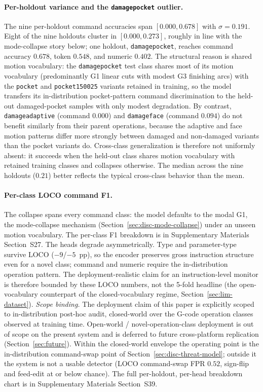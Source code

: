 \documentclass[sensors,article,submit,moreauthors,pdftex]{Definitions/mdpi}
\begin{document}
\paragraph{Per-holdout variance and the \texttt{damagepocket} outlier.} The nine per-holdout command accuracies span $[0.000, 0.678]$ with $\sigma = 0.191$. Eight of the nine holdouts cluster in $[0.000, 0.273]$, roughly in line with the mode-collapse story below; one holdout, \texttt{damagepocket}, reaches command accuracy $0.678$, token $0.548$, and numeric $0.402$. The structural reason is shared motion vocabulary: the \texttt{damagepocket} test class shares most of its motion vocabulary (predominantly G1 linear cuts with modest G3 finishing arcs) with the \texttt{pocket} and \texttt{pocket150025} variants retained in training, so the model transfers its in-distribution pocket-pattern command discrimination to the held-out damaged-pocket samples with only modest degradation. By contrast, \texttt{damageadaptive} (command $0.000$) and \texttt{damageface} (command $0.094$) do not benefit similarly from their parent operations, because the adaptive and face motion patterns differ more strongly between damaged and non-damaged variants than the pocket variants do. Cross-class generalization is therefore not uniformly absent: it succeeds when the held-out class shares motion vocabulary with retained training classes and collapses otherwise. The median across the nine holdouts ($0.21$) better reflects the typical cross-class behavior than the mean.

\paragraph{Per-class LOCO command F1.} The collapse spans every command class: the model defaults to the modal G1, the mode-collapse mechanism (Section~\ref{sec:disc-mode-collapse}) under an unseen motion vocabulary. The per-class F1 breakdown is in Supplementary Materials Section~S27. The heads degrade asymmetrically. Type and parameter-type survive LOCO ($-9$/$-5$~pp), so the encoder preserves gross instruction structure even for a novel class; command and numeric require the in-distribution operation pattern. The deployment-realistic claim for an instruction-level monitor is therefore bounded by these LOCO numbers, not the 5-fold headline (the open-vocabulary counterpart of the closed-vocabulary regime, Section~\ref{sec:lim-dataset}). \emph{Scope binding.} The deployment claim of this paper is explicitly scoped to in-distribution post-hoc audit, closed-world over the G-code operation classes observed at training time. Open-world / novel-operation-class deployment is out of scope on the present system and is deferred to future cross-platform replication (Section~\ref{sec:future}). Within the closed-world envelope the operating point is the in-distribution command-swap point of Section~\ref{sec:disc-threat-model}; outside it the system is not a usable detector (LOCO command-swap FPR $0.52$, sign-flip and feed-edit at or below chance). The full per-holdout, per-head breakdown chart is in Supplementary Materials Section~S39.
\end{document}
